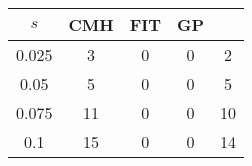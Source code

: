 \centering \begin{tabular}{c|c|c|c|c}
$s$	&CMH	&FIT	&GP	&\sc{Clear}\\\hline
0.025	&3	&0	&0	&2\\
0.05	&5	&0	&0	&5\\
0.075	&11	&0	&0	&10\\
0.1	&15	&0	&0	&14\\
\end{tabular}
